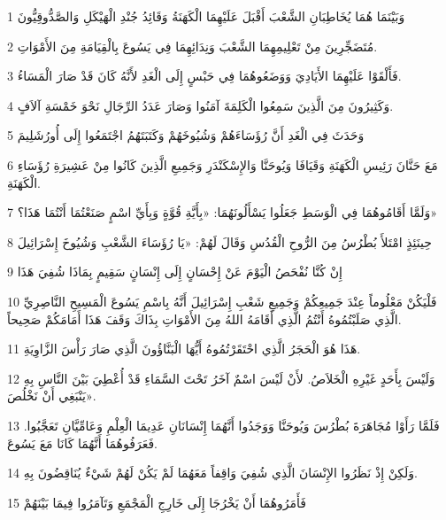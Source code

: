 \par 1 وَبَيْنَمَا هُمَا يُخَاطِبَانِ الشَّعْبَ أَقْبَلَ عَلَيْهِمَا الْكَهَنَةُ وَقَائِدُ جُنْدِ الْهَيْكَلِ وَالصَّدُّوقِيُّونَ
\par 2 مُتَضَجِّرِينَ مِنْ تَعْلِيمِهِمَا الشَّعْبَ وَنِدَائِهِمَا فِي يَسُوعَ بِالْقِيَامَةِ مِنَ الأَمْوَاتِ.
\par 3 فَأَلْقَوْا عَلَيْهِمَا الأَيَادِيَ وَوَضَعُوهُمَا فِي حَبْسٍ إِلَى الْغَدِ لأَنَّهُ كَانَ قَدْ صَارَ الْمَسَاءُ.
\par 4 وَكَثِيرُونَ مِنَ الَّذِينَ سَمِعُوا الْكَلِمَةَ آمَنُوا وَصَارَ عَدَدُ الرِّجَالِ نَحْوَ خَمْسَةِ آلاَفٍ.
\par 5 وَحَدَثَ فِي الْغَدِ أَنَّ رُؤَسَاءَهُمْ وَشُيُوخَهُمْ وَكَتَبَتَهُمُ اجْتَمَعُوا إِلَى أُورُشَلِيمَ
\par 6 مَعَ حَنَّانَ رَئِيسِ الْكَهَنَةِ وَقَيَافَا وَيُوحَنَّا وَالإِسْكَنْدَرِ وَجَمِيعِ الَّذِينَ كَانُوا مِنْ عَشِيرَةِ رُؤَسَاءِ الْكَهَنَةِ.
\par 7 وَلَمَّا أَقَامُوهُمَا فِي الْوَسَطِ جَعَلُوا يَسْأَلُونَهُمَا: «بِأَيَّةِ قُوَّةٍ وَبِأَيِّ اسْمٍ صَنَعْتُمَا أَنْتُمَا هَذَا؟»
\par 8 حِينَئِذٍ امْتَلأَ بُطْرُسُ مِنَ الرُّوحِ الْقُدُسِ وَقَالَ لَهُمْ: «يَا رُؤَسَاءَ الشَّعْبِ وَشُيُوخَ إِسْرَائِيلَ
\par 9 إِنْ كُنَّا نُفْحَصُ الْيَوْمَ عَنْ إِحْسَانٍ إِلَى إِنْسَانٍ سَقِيمٍ بِمَاذَا شُفِيَ هَذَا
\par 10 فَلْيَكُنْ مَعْلُوماً عِنْدَ جَمِيعِكُمْ وَجَمِيعِ شَعْبِ إِسْرَائِيلَ أَنَّهُ بِاسْمِ يَسُوعَ الْمَسِيحِ النَّاصِرِيِّ الَّذِي صَلَبْتُمُوهُ أَنْتُمُ الَّذِي أَقَامَهُ اللهُ مِنَ الأَمْوَاتِ بِذَاكَ وَقَفَ هَذَا أَمَامَكُمْ صَحِيحاً.
\par 11 هَذَا هُوَ الْحَجَرُ الَّذِي احْتَقَرْتُمُوهُ أَيُّهَا الْبَنَّاؤُونَ الَّذِي صَارَ رَأْسَ الزَّاوِيَةِ.
\par 12 وَلَيْسَ بِأَحَدٍ غَيْرِهِ الْخَلاَصُ. لأَنْ لَيْسَ اسْمٌ آخَرُ تَحْتَ السَّمَاءِ قَدْ أُعْطِيَ بَيْنَ النَّاسِ بِهِ يَنْبَغِي أَنْ نَخْلُصَ».
\par 13 فَلَمَّا رَأَوْا مُجَاهَرَةَ بُطْرُسَ وَيُوحَنَّا وَوَجَدُوا أَنَّهُمَا إِنْسَانَانِ عَدِيمَا الْعِلْمِ وَعَامِّيَّانِ تَعَجَّبُوا. فَعَرَفُوهُمَا أَنَّهُمَا كَانَا مَعَ يَسُوعَ.
\par 14 وَلَكِنْ إِذْ نَظَرُوا الإِنْسَانَ الَّذِي شُفِيَ وَاقِفاً مَعَهُمَا لَمْ يَكُنْ لَهُمْ شَيْءٌ يُنَاقِضُونَ بِهِ.
\par 15 فَأَمَرُوهُمَا أَنْ يَخْرُجَا إِلَى خَارِجِ الْمَجْمَعِ وَتَآمَرُوا فِيمَا بَيْنَهُمْ
